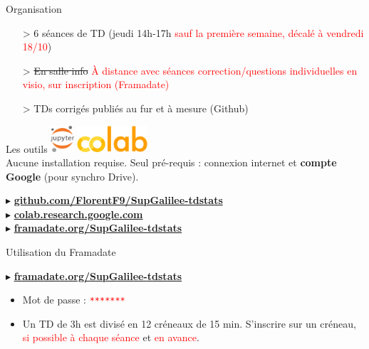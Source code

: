 \documentclass{beamer}
\begin{document}
  \begin{frame}{Organisation}

    \begin{itemize}
      \item[>] 6 séances de TD (jeudi 14h-17h \small{\textcolor{red}{sauf la première semaine, décalé à vendredi 18/10}})
      \item[>] \sout{En salle info} \textcolor{red}{À distance avec séances correction/questions individuelles en visio, sur inscription (Framadate)}
      \item[>] TDs corrigés publiés au fur et à mesure (Github)
    \end{itemize}

    \begin{block}{Les outils}
      \centering
      \includegraphics[height=1cm]{./rc/jupyter.png}\;
      \includegraphics[height=1cm]{./rc/colab.png}\\
      Aucune installation requise. Seul pré-requis : connexion internet et \textbf{compte Google} (pour synchro Drive).
    \end{block}

    $\blacktriangleright$ \textbf{\href{https://github.com/FlorentF9/SupGalilee-tdstats}{github.com/FlorentF9/SupGalilee-tdstats}}\\
    $\blacktriangleright$ \textbf{\href{https://colab.research.google.com}{colab.research.google.com}}\\
    $\blacktriangleright$ \textbf{\href{https://framadate.org/SupGalilee-tdstats}{framadate.org/SupGalilee-tdstats}}
    
  \end{frame}

  \begin{frame}{Utilisation du Framadate}

    \begin{center}
      $\blacktriangleright$ \textbf{\href{https://framadate.org/SupGalilee-tdstats}{framadate.org/SupGalilee-tdstats}}
    \end{center}

    \begin{itemize}
      \item Mot de passe : \textcolor{red}{\texttt{*******}}
      \item Un TD de 3h est divisé en 12 créneaux de 15 min. S'inscrire sur un créneau, \textcolor{red}{si possible à chaque séance} et \textcolor{red}{en avance}.
    \end{itemize}

  \end{frame}
\end{document}
